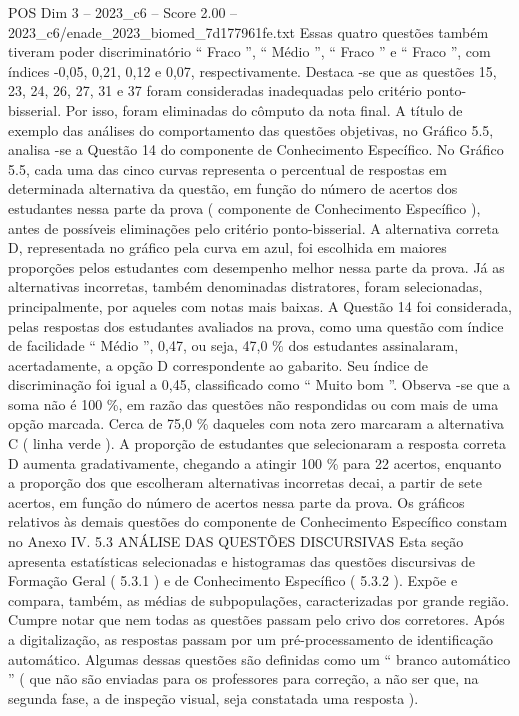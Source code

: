 \begin{textsample}{POS Dim 3 – 2023\_c6 – Score 2.00 – 2023\_c6/enade\_2023\_biomed\_7d177961fe.txt}
Essas quatro questões também tiveram poder discriminatório “ Fraco ”, “ Médio ”, “ Fraco ” e “ Fraco ”, com índices -0,05, 0,21, 0,12 e 0,07, respectivamente.
Destaca -se que as questões 15, 23, 24, 26, 27, 31 e 37 foram consideradas inadequadas pelo critério ponto-bisserial.
Por isso, foram eliminadas do cômputo da nota final.
A título de exemplo das análises do comportamento das questões objetivas, no Gráfico 5.5, analisa -se a Questão 14 do componente de Conhecimento Específico.
No Gráfico 5.5, cada uma das cinco curvas representa o percentual de respostas em determinada alternativa da questão, em função do número de acertos dos estudantes nessa parte da prova ( componente de Conhecimento Específico ), antes de possíveis eliminações pelo critério ponto-bisserial.
A alternativa correta D, representada no gráfico pela curva em azul, foi escolhida em maiores proporções pelos estudantes com desempenho melhor nessa parte da prova.
Já as alternativas incorretas, também denominadas distratores, foram selecionadas, principalmente, por aqueles com notas mais baixas.
A Questão 14 foi considerada, pelas respostas dos estudantes avaliados na prova, como uma questão com índice de facilidade “ Médio ”, 0,47, ou seja, 47,0 \% dos estudantes assinalaram, acertadamente, a opção D correspondente ao gabarito.
Seu índice de discriminação foi igual a 0,45, classificado como “ Muito bom ”.
Observa -se que a soma não é 100 \%, em razão das questões não respondidas ou com mais de uma opção marcada.
Cerca de 75,0 \% daqueles com nota zero marcaram a alternativa C ( linha verde ).
A proporção de estudantes que selecionaram a resposta correta D aumenta gradativamente, chegando a atingir 100 \% para 22 acertos, enquanto a proporção dos que escolheram alternativas incorretas decai, a partir de sete acertos, em função do número de acertos nessa parte da prova.
Os gráficos relativos às demais questões do componente de Conhecimento Específico constam no Anexo IV. 5.3 ANÁLISE DAS QUESTÕES DISCURSIVAS Esta seção apresenta estatísticas selecionadas e histogramas das questões discursivas de Formação Geral ( 5.3.1 ) e de Conhecimento Específico ( 5.3.2 ).
Expõe e compara, também, as médias de subpopulações, caracterizadas por grande região.
Cumpre notar que nem todas as questões passam pelo crivo dos corretores.
Após a digitalização, as respostas passam por um pré-processamento de identificação automático.
Algumas dessas questões são definidas como um “ branco automático ” ( que não são enviadas para os professores para correção, a não ser que, na segunda fase, a de inspeção visual, seja constatada uma resposta ).

\end{textsample}
